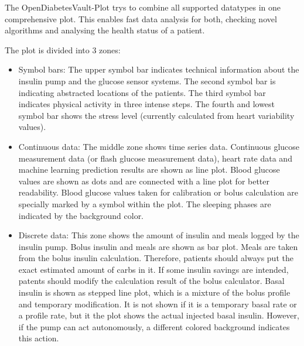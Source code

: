 \begin{changemargin}{4em}{4em} 

The OpenDiabetesVault-Plot trys to combine all supported datatypes in one comprehensive plot.
This enables fast data analysis for both, checking novel algorithms and analysing the health status of a patient.

The plot is divided into 3 zones:
\begin{itemize}
 \item Symbol bars: The upper symbol bar indicates technical information about the insulin pump and the glucose sensor systems.
 The second symbol bar is indicating abstracted locations of the patients.
 The third symbol bar indicates physical activity in three intense steps.
 The fourth and lowest symbol bar shows the stress level (currently calculated from heart variability values).
 \item Continuous data: The middle zone shows time series data.
 Continuous glucose measurement data (or flash glucose measurement data), heart rate data and machine learning prediction results are shown as line plot.
 Blood glucose values are shown as dots and are connected with a line plot for better readability.
 Blood glucose values taken for calibration or bolus calculation are specially marked by a symbol within the plot.
 The sleeping phases are indicated by the background color.
 \item Discrete data: This zone shows the amount of insulin and meals logged by the insulin pump. 
 Bolus insulin and meals are shown as bar plot.
 Meals are taken from the bolus insulin calculation.
 Therefore, patients should always put the exact estimated amount of carbs in it. 
 If some insulin savings are intended, patents should modify the calculation result of the bolus calculator.
 Basal insulin is shown as stepped line plot, which is a mixture of the bolus profile and temporary modification.
 It is not shown if it is a temporary basal rate or a profile rate, but it the plot shows the actual injected basal insulin.
 However, if the pump can act autonomously, a different colored background indicates this action.
\end{itemize}

\end{changemargin}

